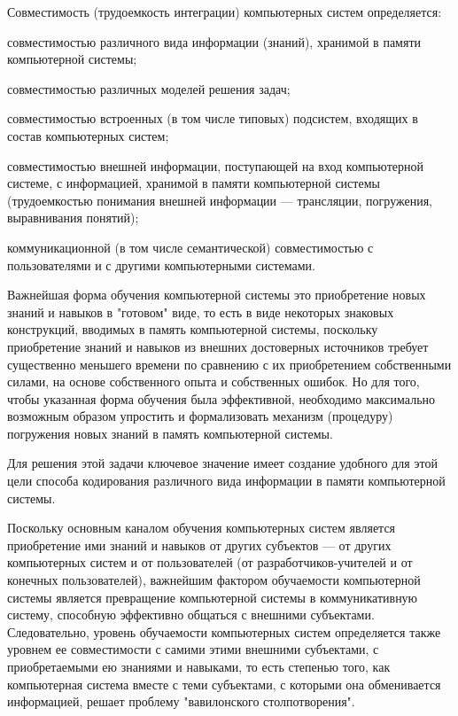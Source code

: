 Совместимость (трудоемкость интеграции) компьютерных систем определяется:
\begin{textitemize}
	\item совместимостью различного вида информации (знаний), хранимой в памяти компьютерной системы;
	\item совместимостью различных моделей решения задач;
	\item совместимостью встроенных (в том числе типовых) подсистем, входящих в состав компьютерных систем;
	\item совместимостью внешней информации, поступающей на вход компьютерной системе, с информацией, хранимой в памяти компьютерной системы (трудоемкостью понимания внешней информации --- трансляции, погружения, выравнивания понятий);
	\item коммуникационной (в том числе семантической) совместимостью с пользователями и с другими компьютерными системами.
\end{textitemize}

Важнейшая форма обучения компьютерной системы это приобретение новых знаний и навыков в "готовом"{} виде, то есть в виде некоторых знаковых конструкций, вводимых в память компьютерной системы, поскольку приобретение знаний и навыков из внешних достоверных источников требует существенно меньшего времени по сравнению с их приобретением собственными силами, на основе собственного опыта и собственных ошибок. Но для того, чтобы указанная форма обучения была эффективной, необходимо максимально возможным образом упростить и формализовать механизм (процедуру) погружения новых знаний в память компьютерной системы.

Для решения этой задачи ключевое значение имеет создание удобного для этой цели способа кодирования различного вида информации в памяти компьютерной системы.

Поскольку основным каналом обучения компьютерных систем является приобретение ими знаний и навыков от других субъектов --- от других компьютерных систем и от пользователей (от разработчиков-учителей и от конечных пользователей), важнейшим фактором обучаемости компьютерной системы является превращение компьютерной системы в коммуникативную систему, способную эффективно общаться с внешними субъектами. Следовательно, уровень обучаемости компьютерных систем определяется также уровнем ее совместимости с самими этими внешними субъектами, с приобретаемыми ею знаниями и навыками, то есть степенью того, как компьютерная система вместе с теми субъектами, с которыми она обменивается информацией, решает проблему "вавилонского столпотворения"{}.

% 